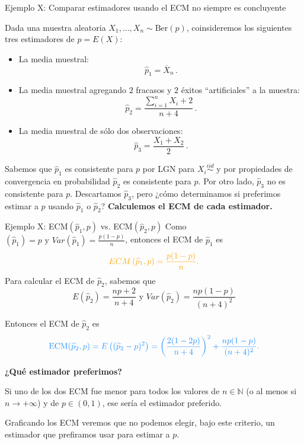 \documentclass{beamer}
\theoremstyle{definition}
\newcommand{\NN}{\mathbb{N}}
\begin{document}
\begin{frame}{\color{rosee} \small Ejemplo X: Comparar estimadores usando el ECM no siempre es concluyente} \small 
  
Dada una muestra aleatoria $X_{1},\dots, X_{n} \sim \text{Ber}(p)$, coinsideremos los siguientes tres estimadores de $p=E(X)$:
    \begin{itemize}
    \item La media muestral: \[\widehat{p}_{1}=  \overline{X}_{n}\,.\]
    \item La media muestral agregando $2$ fracasos y $2$ \'exitos
      ``artificiales'' a la muestra:
      \[\widehat{p}_{2} = \frac{ \sum_{i=1}^{n}X_{i} + 2}{n+4}\,.\]
    \item La media muestral de s\'olo dos observaciones:
      \[\widehat{p}_{3} = \frac{X_{1}+X_{2}}{2}\,.\]
    \end{itemize}
  Sabemos que $\widehat{p}_{1}$ es consistente para $p$ por LGN para $X_i\stackrel{iid}{\sim}$ y por propiedades de convergencia en probabilidad $\widehat{p}_{2}$ es consistente para $p$. Por otro lado, $\widehat{p}_{3}$ no es consistente para $p$. Descartamos $\widehat{p}_{3}$, pero ¿c\'omo determinamos si preferimos estimar a $p$ usando $\widehat{p}_{1}$ o $\widehat{p}_{2}$? \textbf{Calculemos el ECM de cada estimador.}
\end{frame}


\begin{frame}{\color{rosee}Ejemplo X: \color{orang} ECM$(\widehat{p}_{1},p)$ \color{rosee}vs. \color{dodgerblue} ECM$(\widehat{p}_{2},p)$}
      Como $\left(\widehat{p}_{1}\right) =  p \text{ y } Var(\widehat{p}_{1})=\frac{p(1-p)}{n}$, entonces el ECM de $\widehat{p}_{1}$ es
    \[\color{orang}ECM\left(\widehat{p}_{1},p \right)=\frac{p(1-p)}{n}.\]
Para calcular el ECM de $\widehat{p}_{2}$, sabemos que
      \[E\left(\widehat{p}_{2}\right) =  \frac{np+2}{n+4}\text{ y } Var(\widehat{p}_{2})=\frac{np(1-p)}{(n+4)^2}\]
      
      Entonces el ECM de $\widehat{p}_{2}$ es
      \[\color{dodgerblue}\text{ECM}(\widehat{p}_2,p) 
      = E\left( (\widehat{p}_{2} - p)^{2} \right)=
        \left(\frac{2(1 -2p)}{n+4}\right)^2
        + \frac{np(1-p)}{(n+4)^{2}}.\]

      \textbf{     ¿Qué estimador preferimos? }

 Si uno de los dos ECM fue menor para todos los valores
    de $n\in \NN$ (o al menos si $n\to +\infty$) y de $p\in (0,1)$, ese ser\'ia el estimador preferido.
    
Graficando los ECM veremos que no podemos elegir, bajo este criterio, un estimador que prefiramos usar para estimar a $p$.
\end{frame}
\end{document}
